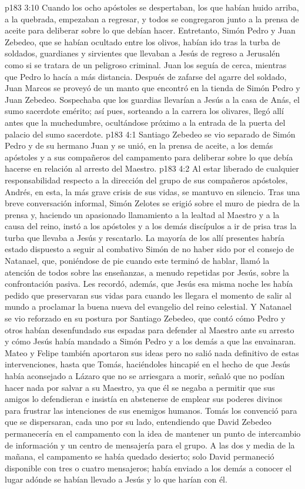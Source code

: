 \vs p183 3:10 Cuando los ocho apóstoles se despertaban, los que habían huido arriba, a la quebrada, empezaban a regresar, y todos se congregaron junto a la prensa de aceite para deliberar sobre lo que debían hacer. Entretanto, Simón Pedro y Juan Zebedeo, que se habían ocultado entre los olivos, habían ido tras la turba de soldados, guardianes y sirvientes que llevaban a Jesús de regreso a Jerusalén como si se tratara de un peligroso criminal. Juan los seguía de cerca, mientras que Pedro lo hacía a más distancia. Después de zafarse del agarre del soldado, Juan Marcos se proveyó de un manto que encontró en la tienda de Simón Pedro y Juan Zebedeo. Sospechaba que los guardias llevarían a Jesús a la casa de Anás, el sumo sacerdote emérito; así pues, sorteando a la carrera los olivares, llegó allí antes que la muchedumbre, ocultándose próximo a la entrada de la puerta del palacio del sumo sacerdote.
\vs p183 4:1 Santiago Zebedeo se vio separado de Simón Pedro y de su hermano Juan y se unió, en la prensa de aceite, a los demás apóstoles y a sus compañeros del campamento para deliberar sobre lo que debía hacerse en relación al arresto del Maestro.
\vs p183 4:2 Al estar liberado de cualquier responsabilidad respecto a la dirección del grupo de sus compañeros apóstoles, Andrés, en esta, la más grave crisis de sus vidas, se mantuvo en silencio. Tras una breve conversación informal, Simón Zelotes se erigió sobre el muro de piedra de la prensa y, haciendo un apasionado llamamiento a la lealtad al Maestro y a la causa del reino, instó a los apóstoles y a los demás discípulos a ir de prisa tras la turba que llevaba a Jesús y rescatarlo. La mayoría de los allí presentes habría estado dispuesto a seguir al combativo Simón de no haber sido por el consejo de Natanael, que, poniéndose de pie cuando este terminó de hablar, llamó la atención de todos sobre las enseñanzas, a menudo repetidas por Jesús, sobre la confrontación pasiva. Les recordó, además, que Jesús esa misma noche les había pedido que preservaran sus vidas para cuando les llegara el momento de salir al mundo a proclamar la buena nueva del evangelio del reino celestial. Y Natanael se vio reforzado en su postura por Santiago Zebedeo, que contó cómo Pedro y otros habían desenfundado sus espadas para defender al Maestro ante su arresto y cómo Jesús había mandado a Simón Pedro y a los demás a que las envainaran. Mateo y Felipe también aportaron sus ideas pero no salió nada definitivo de estas intervenciones, hasta que Tomás, haciéndoles hincapié en el hecho de que Jesús había aconsejado a Lázaro que no se arriesgara a morir, señaló que no podían hacer nada por salvar a su Maestro, ya que él se negaba a permitir que sus amigos lo defendieran e insistía en abstenerse de emplear sus poderes divinos para frustrar las intenciones de sus enemigos humanos. Tomás los convenció para que se dispersaran, cada uno por su lado, entendiendo que David Zebedeo permanecería en el campamento con la idea de mantener un punto de intercambio de información y un centro de mensajería para el grupo. A las dos y media de la mañana, el campamento se había quedado desierto; solo David permaneció disponible con tres o cuatro mensajeros; había enviado a los demás a conocer el lugar adónde se habían llevado a Jesús y lo que harían con él.
